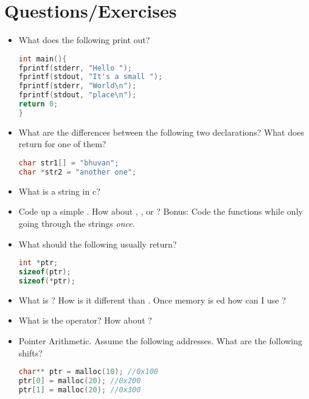 \section{Questions/Exercises}

\begin{itemize}
	\item
	      What does the following print out?

	      \begin{lstlisting}[language=C]
int main(){
fprintf(stderr, "Hello ");
fprintf(stdout, "It's a small ");
fprintf(stderr, "World\n");
fprintf(stdout, "place\n");
return 0;
}
\end{lstlisting}
	\item
	      What are the differences between the following two declarations? What
	      does  return for one of them?

	      \begin{lstlisting}[language=C]
char str1[] = "bhuvan";
char *str2 = "another one";
\end{lstlisting}
	\item
	      What is a string in c?
	\item
	      Code up a simple . How about , , or ? Bonus: Code the functions while only going through the strings \emph{once}.
	\item
	      What should the following usually return?

	      \begin{lstlisting}[language=C]
int *ptr;
sizeof(ptr);
sizeof(*ptr);
\end{lstlisting}
	\item
	      What is ? How is it different than . Once memory is ed how can I use ?
	\item
	      What is the \keyword{\&} operator? How about \keyword{*}?
	\item
	      Pointer Arithmetic. Assume the following addresses. What are the following shifts?

	      \begin{lstlisting}[language=C]
char** ptr = malloc(10); //0x100
ptr[0] = malloc(20); //0x200
ptr[1] = malloc(20); //0x300
\end{lstlisting}


\end{itemize}
